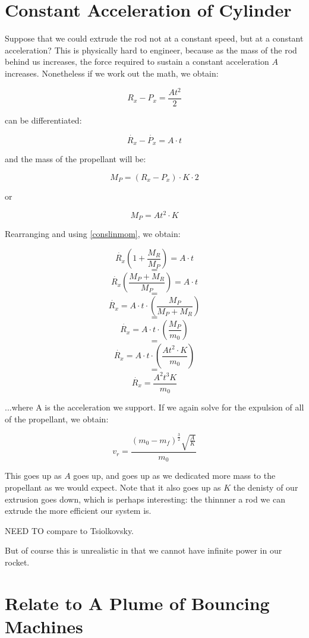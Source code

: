 \documentclass[11pt]{article}
\begin{document}
\section{Constant Acceleration of Cylinder}

Suppose that we could extrude the rod not at a constant speed, but
at a constant acceleration? This is physically hard to engineer,
because as the mass of the rod behind us increases, the force required
to sustain a constant acceleration $A$ increases. Nonetheless if we
work out the math, we obtain:

\[
\tag{Constant Acceleration} R_x - P_x  = \frac{A t^2}{2}
\]

\label{Constant Acceleration} can be differentiated:

\[
\tag{Velocities under C.A.} \dot{R_x} - \dot{P_x}  = A \cdot t
\]

and the mass of the propellant will be:

\[
 M_P = (R_x - P_x)\cdot K \cdot 2
\]

or

\[
 M_P = A t^2 \cdot K 
\]


Rearranging and using \eqref{conslinmom}, we obtain:

\[
\dot{R_x}(1 + \frac{M_R}{M_P} ) = A \cdot t
\]
\[
=
\]
\[
\dot{R_x}(\frac{M_P + M_R}{M_P} ) = A \cdot t
\]
\[
=
\]
\[
\dot{R_x} = A \cdot t \cdot (\frac{M_P}{M_P + M_R} )
\]
\[
=
\]
\[
\dot{R_x} = A \cdot t \cdot (\frac{M_P}{m_0} )
\]
\[
=
\]
\[
\dot{R_x} = A \cdot t \cdot (\frac{A t^2 \cdot K }{m_0} )
\]
\[
=
\]
\[
\dot{R_x} = \frac{A^2 t^3 K}{m_0}
\]

...where A is the acceleration we support. If we again solve for the
expulsion of all of the propellant, we obtain:

\[
v_r = \frac{(m_0 - m_f)^\frac{3}{2}\sqrt{\frac{A}{K}}}{m_0}
\]

This goes up as $A$ goes up, and goes up as we dedicated more mass to the propellant as we would expect.
Note that it also goes up as $K$ the denisty of our extrusion goes down, which is perhaps interesting:
the thinnner a rod we can extrude the more efficient our system is.

NEED TO compare to Tsiolkovsky.

But of course this is unrealistic in that we cannot have infinite power in our rocket.

\section{Relate to A Plume of Bouncing Machines}
\end{document}
